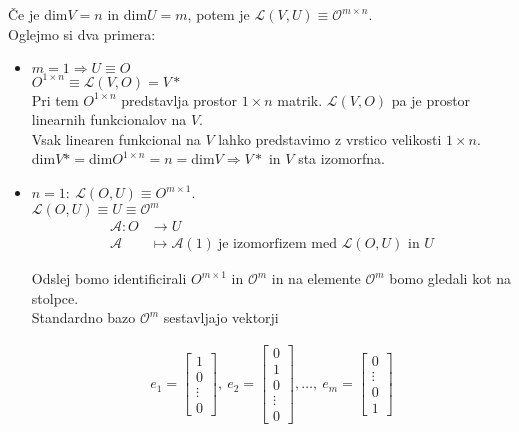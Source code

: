 \documentclass[a4paper,12pt]{article}
\begin{document}
Če je dim$V=n$ in dim$U=m$, potem je $\mathcal{L}(V,U)\equiv \mathcal{O}^{m\times n}$. \\

Oglejmo si dva primera:
\begin{itemize}
	\item $m=1 \Rightarrow U \equiv O$ \\
	
	$O^{1\times n} \equiv \mathcal{L}(V,O)=V*$ \\

	Pri tem $O^{1\times n}$ predstavlja prostor $1\times n$ matrik. $\mathcal{L}(V,O)$ pa je prostor linearnih funkcionalov na $V$.\\

	Vsak linearen funkcional na $V$ lahko predstavimo z vrstico velikosti $1\times n$. \\

	dim$V*=$dim$O^{1\times n}=n=$dim$V\Rightarrow V*$ in $V$ sta izomorfna. \\

	\item $n=1:~\mathcal{L}(O,U)\equiv O^{m\times 1}$. \\
	
	$\mathcal{L}(O,U)\equiv U \equiv \mathcal{O}^m$ 
	\begin{align*}
	\mathcal{A}: O &\to U \\
	\mathcal{A} & \mapsto \mathcal{A}(1)~ \text{je izomorfizem med $\mathcal{L}(O,U)$ in $U$}
	\end{align*}

	Odslej bomo identificirali $O^{m\times 1}$ in $\mathcal{O}^m$ in na elemente $\mathcal{O}^m$ bomo gledali kot na stolpce. \\

	Standardno bazo $\mathcal{O}^m$ sestavljajo vektorji

	\begin{gather*}
		e_1=
		\begin{bmatrix}
			1 \\
			0 \\
			\vdots \\
			0
		\end{bmatrix}
		,~e_2=
		\begin{bmatrix}
			0 \\
			1 \\
			0 \\
			\vdots \\
			0
		\end{bmatrix}
		,\ldots,~e_m=
		\begin{bmatrix}
			0 \\
			\vdots\\
			0 \\
			1
		\end{bmatrix}
	\end{gather*}
\end{itemize}
\end{document}
